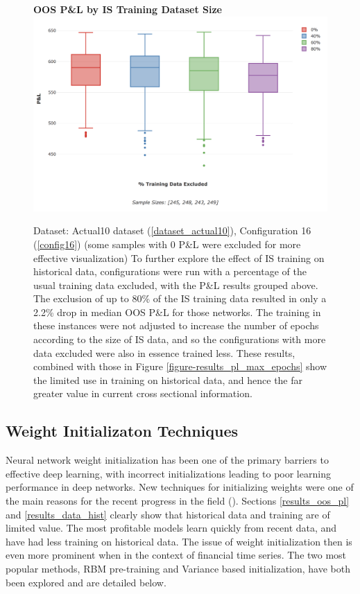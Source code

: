 \documentclass[a4paper,11pt,oneside]{article}
\theoremstyle{plain}
\theoremstyle{definition}
\begin{document}
	
	\begin{figure}[H]
		\centering 
		\textbf{OOS P\&L by IS Training Dataset Size}
		\includegraphics[scale=0.4]{images/results/data/training_data_excluded.png}
		\caption[OOS P\&L by IS Training Dataset Size]{
			Dataset: Actual10 dataset (\ref{dataset_actual10}), Configuration 16 (\ref{config16}) (some samples with 0 P\&L were excluded for more effective visualization)
			\newline To further explore the effect of IS training on historical data, configurations were run with a percentage of the usual training data excluded, with the P\&L results grouped above. The exclusion of up to 80\% of the IS training data resulted in only a 2.2\% drop in median OOS P\&L for those networks. The training in these instances were not adjusted to increase the number of epochs according to the size of IS data, and so the configurations with more data excluded were also in essence trained less. These results, combined with those in Figure \ref{figure-results_pl_max_epochs} show the limited use in training on historical data, and hence the far greater value in current cross sectional information.}
		\label{figure-results_it3_validationset}
	\end{figure}
	
	
	\newpage
	
	\subsection{Weight Initializaton Techniques}\label{results_init}
	
	Neural network weight initialization has been one of the primary barriers to effective deep learning, with incorrect initializations leading to poor learning performance in deep networks. New techniques for initializing weights were one of the main reasons for the recent progress in the field (\cite{Hinton2}). Sections \ref{results_oos_pl} and \ref{results_data_hist} clearly show that historical data and training are of limited value. The most profitable models learn quickly from recent data, and have had less training on historical data. The issue of weight initialization then is even more prominent when in the context of financial time series. The two most popular methods, RBM pre-training and Variance based initialization, have both been explored and are detailed below.
	
\end{document}
